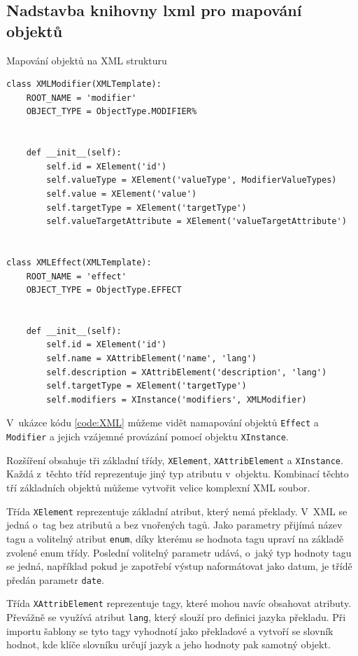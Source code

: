 \documentclass[thesis=B,czech]{resources/FITthesis}[2012/06/26]
\begin{document}
	\subsection{Nadstavba knihovny lxml pro mapování objektů}
	\begin{listing}[htbp]
\caption{\label{code:XML}Mapování objektů na XML strukturu}
\begin{verbatim}
class XMLModifier(XMLTemplate):
    ROOT_NAME = 'modifier'
    OBJECT_TYPE = ObjectType.MODIFIER%


    def __init__(self):
        self.id = XElement('id')
        self.valueType = XElement('valueType', ModifierValueTypes)
        self.value = XElement('value')
        self.targetType = XElement('targetType')
        self.valueTargetAttribute = XElement('valueTargetAttribute')


class XMLEffect(XMLTemplate):
    ROOT_NAME = 'effect'
    OBJECT_TYPE = ObjectType.EFFECT


    def __init__(self):
        self.id = XElement('id')
        self.name = XAttribElement('name', 'lang')
        self.description = XAttribElement('description', 'lang')
        self.targetType = XElement('targetType')
        self.modifiers = XInstance('modifiers', XMLModifier)
\end{verbatim}
\end{listing}
	 V~ukázce kódu  \ref{code:XML} můžeme vidět namapování objektů \texttt{Effect} a \texttt{Modifier} a jejich vzájemné provázání pomocí objektu \texttt{XInstance}. \par

Rozšíření obsahuje tři základní třídy, \texttt{XElement}, \texttt{XAttribElement} a \texttt{XInstance}. Každá z~těchto tříd reprezentuje jiný typ atributu v~objektu. Kombinací těchto tří základních objektů můžeme vytvořit velice komplexní XML soubor. \par

Třída \texttt{XElement} reprezentuje základní atribut, který nemá překlady. V~XML se jedná o~tag bez atributů a bez vnořených tagů. Jako parametry přijímá název tagu a volitelný atribut \texttt{enum}, díky kterému se hodnota tagu upraví na základě zvolené enum třídy. Poslední volitelný parametr udává, o~jaký typ hodnoty tagu se jedná, například pokud je zapotřebí výstup naformátovat jako datum, je třídě předán parametr \texttt{date}. \par

Třída \texttt{XAttribElement} reprezentuje tagy, které mohou navíc obsahovat atributy. Převážně se využívá atribut \texttt{lang}, který slouží pro definici jazyka překladu. Při importu šablony se tyto tagy vyhodnotí jako překladové a vytvoří se slovník hodnot, kde klíče slovníku určují jazyk a jeho hodnoty pak samotný objekt. \par
\end{document}
